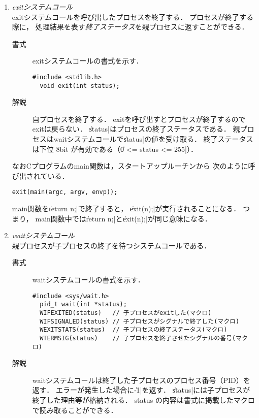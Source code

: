 \begin{enumerate}
\item \emph{exitシステムコール} \\
  exitシステムコールを呼び出したプロセスを終了する．
  プロセスが終了する際に，
  処理結果を表す\emph{終了ステータス}を親プロセスに返すことができる．

  \begin{description}
  \item[書式] exitシステムコールの書式を示す．
\begin{lstlisting}[numbers=none]
  #include <stdlib.h>
  void exit(int status);
\end{lstlisting}

  \item[解説] 自プロセスを終了する．
    exitを呼び出すとプロセスが終了するのでexitは戻らない．
    \|status|はプロセスの終了ステータスである．
    親プロセスはwaitシステムコールで\|status|の値を受け取る．
    終了ステータスは下位 8bit が有効である（\|0 <= status <= 255|）．
  \end{description}

  なおCプログラムのmain関数は，スタートアップルーチンから
  次のように呼び出されている．

  \centerline{\texttt{exit(main(argc, argv, envp));}}

  main関数を\|return n;|で終了すると，
  \|exit(n);|が実行されることになる．
  つまり，
  main関数中では\|return n;|と\|exit(n);|が同じ意味になる．

\item \emph{waitシステムコール} \\
  親プロセスが子プロセスの終了を待つシステムコールである．
  \begin{description}
  \item[書式] waitシステムコールの書式を示す．

\begin{lstlisting}[numbers=none]
  #include <sys/wait.h>
  pid_t wait(int *status);
  WIFEXITED(status)   // 子プロセスがexitした(マクロ)
  WIFSIGNALED(status) // 子プロセスがシグナルで終了した(マクロ)
  WEXITSTATS(status)  // 子プロセスの終了ステータス(マクロ)
  WTERMSIG(status)    // 子プロセスを終了させたシグナルの番号(マクロ)
\end{lstlisting}

  \item[解説] 
    waitシステムコールは終了した子プロセスのプロセス番号（PID）を返す．
    エラーが発生した場合に\|-1|を返す．
    \|status|には子プロセスが終了した理由等が格納される．
    status の内容は書式に掲載したマクロで読み取ることができる．
  \end{description}
\end{enumerate}

